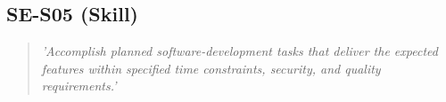 \subsection{SE-S05 (Skill)}

  \begin{quote}
    \textit{'Accomplish planned software-development tasks
    that deliver the expected features within specified time
    constraints, security, and quality requirements.'}
  \end{quote}

\newpage